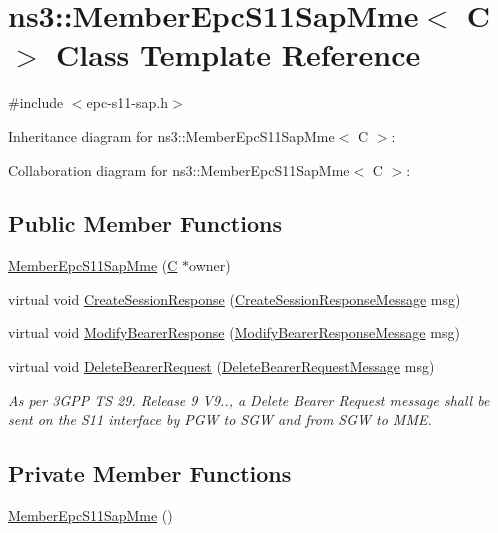 \hypertarget{classns3_1_1MemberEpcS11SapMme}{}\section{ns3\+:\+:Member\+Epc\+S11\+Sap\+Mme$<$ C $>$ Class Template Reference}
\label{classns3_1_1MemberEpcS11SapMme}


{\ttfamily \#include $<$epc-\/s11-\/sap.\+h$>$}



Inheritance diagram for ns3\+:\+:Member\+Epc\+S11\+Sap\+Mme$<$ C $>$\+:


Collaboration diagram for ns3\+:\+:Member\+Epc\+S11\+Sap\+Mme$<$ C $>$\+:
\subsection*{Public Member Functions}
\begin{DoxyCompactItemize}
\item 
\hyperlink{classns3_1_1MemberEpcS11SapMme_a13f9eb35bafdfedf17340186ad8fef15}{Member\+Epc\+S11\+Sap\+Mme} (\hyperlink{loss__COST231__small__cities__urban_8m_aaa53ca0b650dfd85c4f59fa156f7a2cc}{C} $\ast$owner)
\item 
virtual void \hyperlink{classns3_1_1MemberEpcS11SapMme_a16266a78e29b6997c98f871b84c584d3}{Create\+Session\+Response} (\hyperlink{structns3_1_1EpcS11SapMme_1_1CreateSessionResponseMessage}{Create\+Session\+Response\+Message} msg)
\item 
virtual void \hyperlink{classns3_1_1MemberEpcS11SapMme_a6d3f244a615532f1b9499c923c5bed19}{Modify\+Bearer\+Response} (\hyperlink{structns3_1_1EpcS11SapMme_1_1ModifyBearerResponseMessage}{Modify\+Bearer\+Response\+Message} msg)
\item 
virtual void \hyperlink{classns3_1_1MemberEpcS11SapMme_a3ffee3bbd73c9e3fe520c6f266dd4806}{Delete\+Bearer\+Request} (\hyperlink{structns3_1_1EpcS11SapMme_1_1DeleteBearerRequestMessage}{Delete\+Bearer\+Request\+Message} msg)
\begin{DoxyCompactList}\small\item\em As per 3\+G\+PP TS 29. Release 9 V9.., a Delete Bearer Request message shall be sent on the S11 interface by P\+GW to S\+GW and from S\+GW to M\+ME. \end{DoxyCompactList}\end{DoxyCompactItemize}
\subsection*{Private Member Functions}
\begin{DoxyCompactItemize}
\item 
\hyperlink{classns3_1_1MemberEpcS11SapMme_a4f6818b18f6084f992efcb824faf8f78}{Member\+Epc\+S11\+Sap\+Mme} ()
\end{DoxyCompactItemize}

